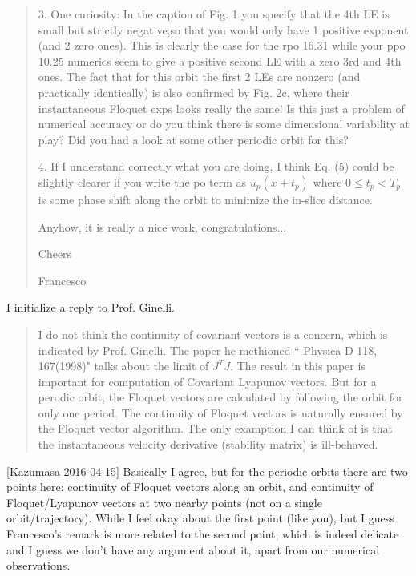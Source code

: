 \begin{description}
\begin{quotation}
3.
One curiosity: In the caption of Fig. 1 you specify that the 4th LE is small but
strictly negative,so that you would only have 1 positive exponent (and 2 zero ones).
This is clearly the case for the rpo 16.31 while your ppo 10.25 numerics seem to give
 a positive second LE with a zero 3rd and
4th ones. The fact that for this orbit the first 2 LEs are nonzero (and practically identically)
 is also confirmed by Fig. 2c,
where their instantaneous Floquet exps looks really the same!
Is this just a problem of numerical accuracy or do you think there is some dimensional
variability at play? Did you had a look at some other periodic orbit for this?

4.
If I understand correctly what you are doing, I think Eq. (5) could be slightly
clearer if you write the po term as $u_p(x +
t_p)$ where $0 \le t_p<T_p$ is some phase shift along the orbit to minimize the in-slice distance.

Anyhow, it is really a nice work, congratulations...

Cheers

Francesco

\end{quotation}

\item[Xiong 2016-04-14]
I initialize a reply to Prof. Ginelli.

\begin{quotation}
  I do not think the continuity of covariant vectors is a concern, which is
  indicated by Prof. Ginelli. The paper he methioned `` Physica D 118, 167(1998)"
   talks about the limit of $J^TJ$. The result in this paper
  is important for computation of Covariant Lyapunov vectors. But for a
  perodic orbit, the Floquet vectors are calculated by following the orbit
  for only one period. The continuity of Floquet vectors is naturally ensured
  by the Floquet vector algorithm. The only examption I can think of is that
  the instantaneous velocity derivative (stability matrix) is ill-behaved.
\end{quotation}
[Kazumasa 2016-04-15]
Basically I agree, but for the periodic orbits there are two points
here: continuity of Floquet vectors along an orbit, and continuity of
Floquet/Lyapunov vectors at two nearby points (not on a single
orbit/trajectory). While I feel okay about the first point (like you),
but I guess Francesco's remark is more related to the second point,
which is indeed delicate and I guess we don't have any argument about
it, apart from our numerical observations.


\end{description}
